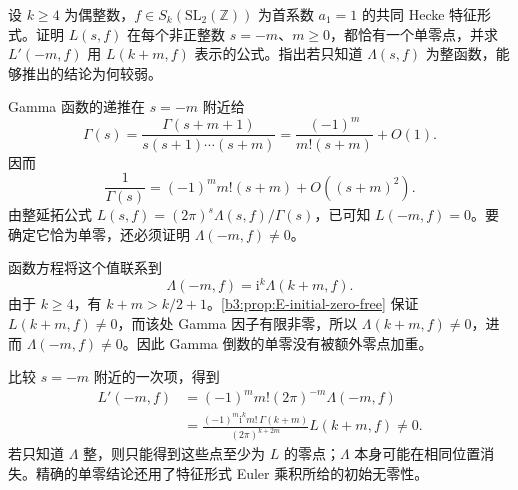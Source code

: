 \begin{exercise}\label{b3:ex:E-5}
设 \(k\ge4\) 为偶整数，\(f\in S_k(\mathrm{SL}_2(\mathbb Z))\) 为首系数 \(a_1=1\) 的共同 Hecke 特征形式。证明 \(L(s,f)\) 在每个非正整数 \(s=-m\)、\(m\ge0\)，都恰有一个单零点，并求 \(L'(-m,f)\) 用 \(L(k+m,f)\) 表示的公式。指出若只知道 \(\Lambda(s,f)\) 为整函数，能够推出的结论为何较弱。
\end{exercise}
\begin{solution}
Gamma 函数的递推在 \(s=-m\) 附近给
\[
 \Gamma(s)=\frac{\Gamma(s+m+1)}{s(s+1)\cdots(s+m)}
 =\frac{(-1)^m}{m!(s+m)}+O(1).
\]
因而
\[
 \frac1{\Gamma(s)}=(-1)^m m!(s+m)+O((s+m)^2).
\]
由整延拓公式
\(L(s,f)=(2\pi)^s\Lambda(s,f)/\Gamma(s)\)，已可知 \(L(-m,f)=0\)。要确定它恰为单零，还必须证明 \(\Lambda(-m,f)\ne0\)。

函数方程将这个值联系到
\[
 \Lambda(-m,f)=\mathrm{i}^k\Lambda(k+m,f).
\]
由于 \(k\ge4\)，有 \(k+m>k/2+1\)。\cref{b3:prop:E-initial-zero-free} 保证 \(L(k+m,f)\ne0\)，而该处 Gamma 因子有限非零，所以 \(\Lambda(k+m,f)\ne0\)，进而 \(\Lambda(-m,f)\ne0\)。因此 Gamma 倒数的单零没有被额外零点加重。

比较 \(s=-m\) 附近的一次项，得到
\[
 \begin{aligned}
 L'(-m,f)
 &=(-1)^m m!(2\pi)^{-m}\Lambda(-m,f)\\
 &=\frac{(-1)^m\mathrm{i}^k m!\,\Gamma(k+m)}
         {(2\pi)^{k+2m}}L(k+m,f)\ne0.
 \end{aligned}
\]
若只知道 \(\Lambda\) 整，则只能得到这些点至少为 \(L\) 的零点；\(\Lambda\) 本身可能在相同位置消失。精确的单零结论还用了特征形式 Euler 乘积所给的初始无零性。
\end{solution}

